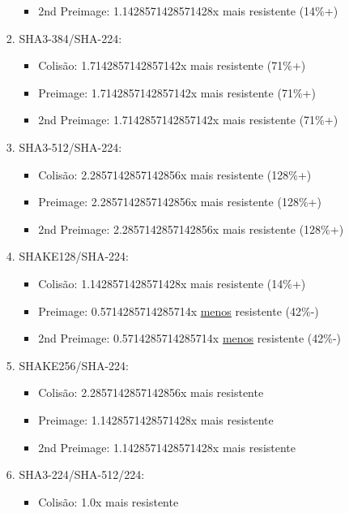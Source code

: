 \documentclass[12pt, a4paper]{article}
\begin{document}
\begin{enumerate}
\begin{enumerate}
\begin{enumerate}
\begin{itemize}
 \item 2nd Preimage: 1.1428571428571428x mais resistente (14\%+)
 \end{itemize}
\item SHA3-384/SHA-224:
 \begin{itemize}
 \item Colisão: 1.7142857142857142x mais resistente (71\%+)

 \item Preimage: 1.7142857142857142x mais resistente (71\%+)

 \item 2nd Preimage: 1.7142857142857142x mais resistente (71\%+)
 \end{itemize}
\item SHA3-512/SHA-224:
 \begin{itemize}
 \item Colisão: 2.2857142857142856x mais resistente (128\%+)

 \item Preimage: 2.2857142857142856x mais resistente (128\%+)

 \item 2nd Preimage: 2.2857142857142856x mais resistente (128\%+)
 \end{itemize}
\item SHAKE128/SHA-224:
 \begin{itemize}
 \item Colisão: 1.1428571428571428x mais resistente (14\%+)

 \item Preimage: 0.5714285714285714x \underline{menos} resistente (42\%-)

 \item 2nd Preimage: 0.5714285714285714x \underline{menos} resistente (42\%-)
 \end{itemize}
\item SHAKE256/SHA-224:
 \begin{itemize}
 \item Colisão: 2.2857142857142856x mais resistente

 \item Preimage: 1.1428571428571428x mais resistente

 \item 2nd Preimage: 1.1428571428571428x mais resistente
 \end{itemize}
\item SHA3-224/SHA-512/224:
 \begin{itemize}
 \item Colisão: 1.0x mais resistente


\end{itemize}
\end{enumerate}
\end{enumerate}
\end{enumerate}
\end{document}
